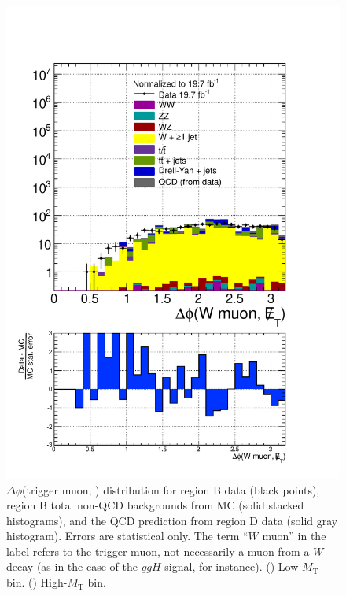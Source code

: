 \begin{figure}[hbtp]
\begin{center}
    \includegraphics[width=\cmsFigWidth]{figures/dataVsMCQCD_dPhiWMuMET_highMT_v87}
    \caption{$\Delta\phi$(trigger muon, \ETslash) distribution for region B data (black points), region B total non-QCD backgrounds from MC (solid stacked histograms), and the QCD prediction from region D data (solid gray histogram).  Errors are statistical only. The term ``$W$ muon'' in the label refers to the trigger muon, not necessarily a muon from a $W$ decay (as in the case of the $ggH$ signal, for instance).  (\cmsLeft) Low-$M_{\text{T}}$ bin. (\cmsRight) High-$M_{\text{T}}$ bin.}
    \label{fig:regB-data-MC-dPhiWMuMET}
  \end{center}
\end{figure}


